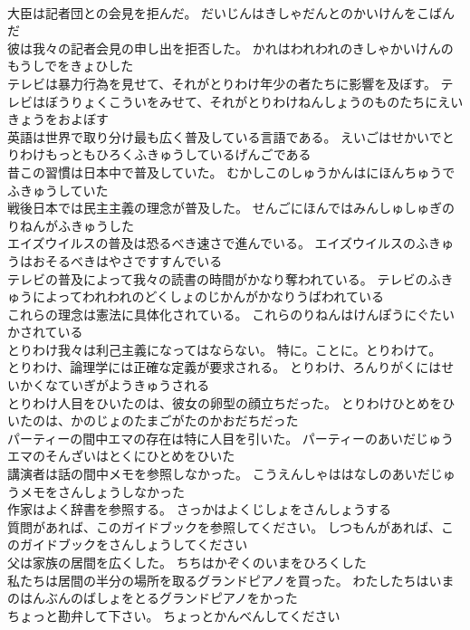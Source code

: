 \documentclass[8pt]{extreport}
\begin{document}
\begin{CJK}{UTF8}{min}
\\	大臣は記者団との会見を拒んだ。	だいじんはきしゃだんとのかいけんをこばんだ 
\\	彼は我々の記者会見の申し出を拒否した。	かれはわれわれのきしゃかいけんのもうしでをきょひした 
\\	テレビは暴力行為を見せて、それがとりわけ年少の者たちに影響を及ぼす。	テレビはぼうりょくこういをみせて、それがとりわけねんしょうのものたちにえいきょうをおよぼす 
\\	英語は世界で取り分け最も広く普及している言語である。	えいごはせかいでとりわけもっともひろくふきゅうしているげんごである 
\\	昔この習慣は日本中で普及していた。	むかしこのしゅうかんはにほんちゅうでふきゅうしていた 
\\	戦後日本では民主主義の理念が普及した。	せんごにほんではみんしゅしゅぎのりねんがふきゅうした 
\\	エイズウイルスの普及は恐るべき速さで進んでいる。	エイズウイルスのふきゅうはおそるべきはやさですすんでいる 
\\	テレビの普及によって我々の読書の時間がかなり奪われている。	テレビのふきゅうによってわれわれのどくしょのじかんがかなりうばわれている 
\\	これらの理念は憲法に具体化されている。	これらのりねんはけんぽうにぐたいかされている 
\\	とりわけ我々は利己主義になってはならない。	特に。ことに。とりわけて。
\\	とりわけ、論理学には正確な定義が要求される。	とりわけ、ろんりがくにはせいかくなていぎがようきゅうされる 
\\	とりわけ人目をひいたのは、彼女の卵型の顔立ちだった。	とりわけひとめをひいたのは、かのじょのたまごがたのかおだちだった 
\\	パーティーの間中エマの存在は特に人目を引いた。	パーティーのあいだじゅうエマのそんざいはとくにひとめをひいた 
\\	講演者は話の間中メモを参照しなかった。	こうえんしゃははなしのあいだじゅうメモをさんしょうしなかった 
\\	作家はよく辞書を参照する。	さっかはよくじしょをさんしょうする 
\\	質問があれば、このガイドブックを参照してください。	しつもんがあれば、このガイドブックをさんしょうしてください 
\\	父は家族の居間を広くした。	ちちはかぞくのいまをひろくした 
\\	私たちは居間の半分の場所を取るグランドピアノを買った。	わたしたちはいまのはんぶんのばしょをとるグランドピアノをかった 
\\	ちょっと勘弁して下さい。	ちょっとかんべんしてください 

\end{CJK}
\end{document}
